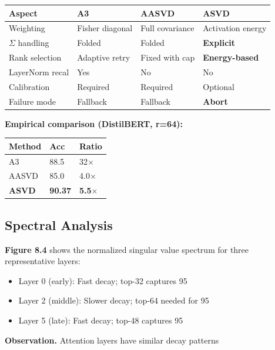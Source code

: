 \begin{table}[H]
\centering
\small
\begin{tabular}{llll}
\toprule
\textbf{Aspect} & \textbf{A3} & \textbf{AASVD} & \textbf{ASVD} \\
\midrule
Weighting & Fisher diagonal & Full covariance & Activation energy \\
$\Sigma$ handling & Folded & Folded & \textbf{Explicit} \\
Rank selection & Adaptive retry & Fixed with cap & \textbf{Energy-based} \\
LayerNorm recal & Yes & No & No \\
Calibration & Required & Required & Optional \\
Failure mode & Fallback & Fallback & \textbf{Abort} \\
\bottomrule
\end{tabular}
\end{table}

\textbf{Empirical comparison (DistilBERT, r=64):}

\begin{table}[H]
\centering
\small
\begin{tabular}{lll}
\toprule
\textbf{Method} & \textbf{Acc} & \textbf{Ratio} \\
\midrule
A3 & 88.5 & 32$\times$ \\
AASVD & 85.0 & 4.0$\times$ \\
\textbf{ASVD} & \textbf{90.37} & \textbf{5.5$\times$} \\
\bottomrule
\end{tabular}
\end{table}

\subsection{Spectral Analysis}

\textbf{Figure 8.4} shows the normalized singular value spectrum for three 
representative layers:

\begin{itemize}
\item Layer 0 (early): Fast decay; top-32 captures 95%
\item Layer 2 (middle): Slower decay; top-64 needed for 95%
\item Layer 5 (late): Fast decay; top-48 captures 95%

\end{itemize}
\textbf{Observation.} Attention layers have similar decay patterns

